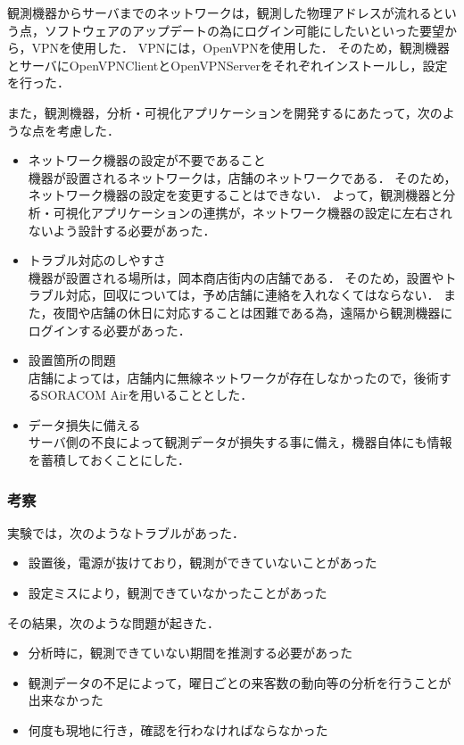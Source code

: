 観測機器からサーバまでのネットワークは，観測した物理アドレスが流れるという点，ソフトウェアのアップデートの為にログイン可能にしたいといった要望から，VPNを使用した．
VPNには，OpenVPNを使用した．
そのため，観測機器とサーバにOpenVPNClientとOpenVPNServerをそれぞれインストールし，設定を行った．

また，観測機器，分析・可視化アプリケーションを開発するにあたって，次のような点を考慮した．
\begin{itemize}
\item ネットワーク機器の設定が不要であること\\
	機器が設置されるネットワークは，店舗のネットワークである．
	そのため，ネットワーク機器の設定を変更することはできない．
	よって，観測機器と分析・可視化アプリケーションの連携が，ネットワーク機器の設定に左右されないよう設計する必要があった．
\item トラブル対応のしやすさ\\
	機器が設置される場所は，岡本商店街内の店舗である．
	そのため，設置やトラブル対応，回収については，予め店舗に連絡を入れなくてはならない．
	また，夜間や店舗の休日に対応することは困難である為，遠隔から観測機器にログインする必要があった．
\item 設置箇所の問題\\
	店舗によっては，店舗内に無線ネットワークが存在しなかったので，後術するSORACOM Airを用いることとした．
\item データ損失に備える\\
	サーバ側の不良によって観測データが損失する事に備え，機器自体にも情報を蓄積しておくことにした．
\end{itemize}

\subsubsection{考察}
実験では，次のようなトラブルがあった．
\begin{itemize}
\item 設置後，電源が抜けており，観測ができていないことがあった
\item 設定ミスにより，観測できていなかったことがあった
\end{itemize}

その結果，次のような問題が起きた．
\begin{itemize}
\item 分析時に，観測できていない期間を推測する必要があった
\item 観測データの不足によって，曜日ごとの来客数の動向等の分析を行うことが出来なかった
\item 何度も現地に行き，確認を行わなければならなかった
\end{itemize}

